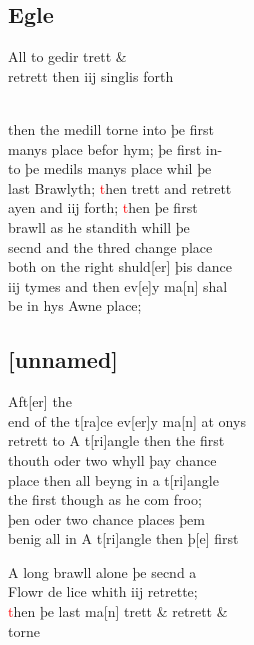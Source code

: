\documentclass[12pt,letter]{article} %
\newcommand{\red}[1]{\textcolor{red}{#1}}
\newcommand{\srcpg}[1]{
    \noindent{
        \color{Gray}{\rule[0.5ex]{\linewidth}{1pt}~#1} 
    
    }
}
\begin{document}
\subsection{Egle}
All to gedir trett \& \\ 
retrett then iij singlis forth \\
\ 
\srcpg{57}
then the medill torne into þe first \\ 
manys place befor hym; þe first in-\\
to þe medils manys place whil þe \\
last Brawlyth; \red{t}hen trett and retrett \\
ayen and iij forth; \red{t}hen þe first \\
brawll as he standith whill þe \\
secnd and the thred change place \\
both on the right shuld{[}er{]} þis dance \\
iij tymes and then ev{[}e{]}y ma{[}n{]} shal \\
be in hys Awne place;

\subsection{{[}unnamed{]}}
Aft{[}er{]} the \\
end of the t{[}ra{]}ce ev{[}er{]}y ma{[}n{]} at onys \\
retrett to A t{[}ri{]}angle then the first \\
thouth oder two whyll þay chance \\
place then all beyng in a t{[}ri{]}angle \\
the first though as he com froo; \\
þen oder two chance places þem \\
benig all in A t{[}ri{]}angle then þ{[}e{]} first 
\srcpg{58} 
A long brawll alone þe secnd a \\
Flowr de lice whith iij retrette; \\
\red{t}hen þe last ma{[}n{]} trett \& retrett \& \\
torne
\end{document}
